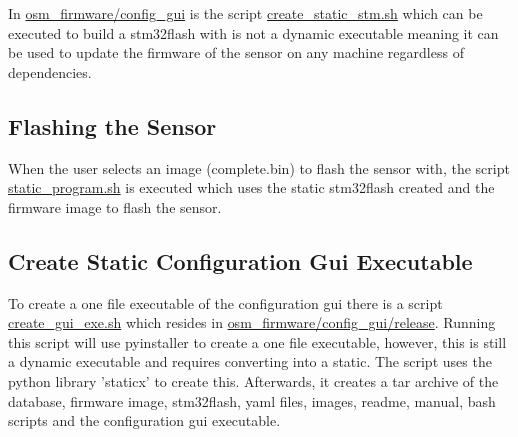 \documentclass[a4paper,12pt, notitlepage]{article}
\begin{document}
In \url{osm_firmware/config_gui} is the script \url{create_static_stm.sh} which can be executed to build a stm32flash with is not a dynamic executable meaning it can be used to update the firmware of the sensor on any machine regardless of dependencies.

\subsection{Flashing the Sensor}

When the user selects an image (complete.bin) to flash the sensor with, the script \url{static_program.sh} is executed which uses the static stm32flash created and the firmware image to flash the sensor.

\subsection{Create Static Configuration Gui Executable}

To create a one file executable of the configuration gui there is a script \url{create_gui_exe.sh} which resides in \url{osm_firmware/config_gui/release}. Running this script will use pyinstaller to create a one file executable, however, this is still a dynamic executable and requires converting into a static. The script uses the python library 'staticx' to create this. Afterwards, it creates a tar archive of the database, firmware image, stm32flash, yaml files, images, readme, manual, bash scripts and the configuration gui executable. 



%
%
\end{document}
